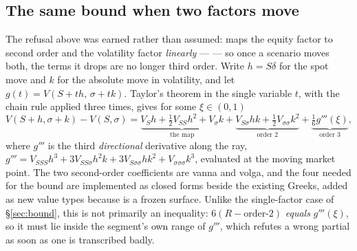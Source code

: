 \documentclass[11pt,a4paper]{article}
\begin{document}
\subsection{The same bound when two factors move}
\label{sec:twofactor}
The refusal above was earned rather than assumed:  maps the equity factor to
second order and the volatility factor \emph{linearly} ---  --- so once a scenario moves both, the terms it drops are no longer third order. Write
$h = S\delta$ for the spot move and $k$ for the absolute move in volatility, and let
$g(t) = V(S + th,\, \sigma + tk)$. Taylor's theorem in the single variable $t$, with the
chain rule applied three times, gives for some $\xi \in (0,1)$
\begin{equation}
\label{eq:twofactor}
V(S{+}h,\sigma{+}k) - V(S,\sigma)
 = \underbrace{V_S h + \tfrac12 V_{SS}h^2 + V_\sigma k}_{\text{the map}}
 + \underbrace{V_{S\sigma}hk + \tfrac12 V_{\sigma\sigma}k^2}_{\text{order }2}
 + \underbrace{\tfrac16 g'''(\xi)}_{\text{order }3},
\end{equation}
where $g'''$ is the third \emph{directional} derivative along the ray,
$g''' = V_{SSS}h^3 + 3V_{SS\sigma}h^2k + 3V_{S\sigma\sigma}hk^2 + V_{\sigma\sigma\sigma}k^3$,
evaluated at the moving market point. The two second-order coefficients are vanna and volga, and the
four needed for the bound are implemented as closed forms beside the existing Greeks, added as new
value types because  is a frozen surface. Unlike the single-factor case of \S\ref{sec:bound}, this is not
primarily an inequality: $6(R - \text{order-2})$ \emph{equals} $g'''(\xi)$, so it must lie inside the
segment's own range of $g'''$, which refutes a wrong partial as soon as one is transcribed badly.
\end{document}
